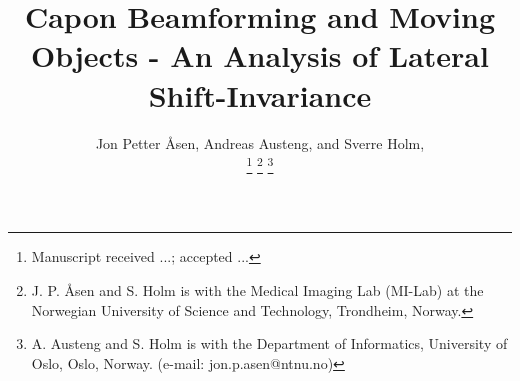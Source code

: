 \documentclass[draftcls]{IEEEtran}
\begin{document}
%
\title{Capon Beamforming and Moving Objects - An Analysis of Lateral Shift-Invariance}
%
%
%

\author{
   Jon Petter \AA{}sen,  Andreas Austeng,  and Sverre Holm, %
   
\thanks{Manuscript received ...; accepted ...}
\thanks{J. P. \AA{}sen and S. Holm is with the Medical Imaging Lab (MI-Lab) at the Norwegian University of Science and Technology, Trondheim, Norway.}
\thanks{A. Austeng and S. Holm is with the Department of Informatics, University of Oslo, Oslo, Norway. (e-mail: jon.p.asen@ntnu.no)} 
}

% 
%
\end{document}

